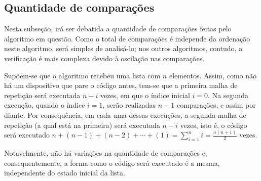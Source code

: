 \subsection{Quantidade de comparações}
Nesta subseção, irá ser debatida a quantidade de comparações feitas pelo algoritmo em questão. Como o total de comparações é independe da ordenação neste algoritmo, será simples de analisá-lo; nos outros algoritmos, contudo, a verificação é mais complexa devido à oscilação nas comparações.

Supõem-se que o algoritmo recebeu uma lista com $n$ elementos. Assim, como não há um dispositivo que pare o código antes, tem-se que a primeira malha de repetição será executada $n-i$ vezes, em que o índice inicial $i=0$. Na segunda execução, quando o índice $i=1$, serão realizadas $n-1$ comparações, e assim por diante. Por consequência, em cada uma dessas execuções, a segunda malha de repetição (a qual está na primeira) será executada $n-i$ vezes, isto é, o código será executado $n+(n-1)+(n-2)+\cdots+(1) = \sum_{i=1}^n i = \frac{n(n+1)}{2}$ vezes.

Notavelmente, não há variações na quantidade de comparações e, consequentemente, a forma como o código será executado é a mesma, independente do estado inicial da lista.